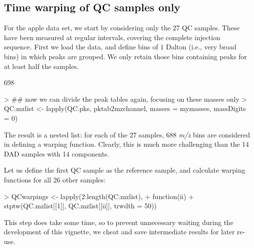 \documentclass[a4paper,11pt]{article}
\begin{document}
\subsection{Time warping of QC samples only}
For the apple data set, we start by considering only the 27 QC
samples. These have been measured at regular intervals,
covering the complete injection sequence. First we load the data, and
define bins of $1$ Dalton (i.e., very broad bins) in which peaks are
grouped. We only retain those bins containing peaks for at least half
the samples.
\begin{Schunk}
\begin{Soutput}
[1] 698
\end{Soutput}
\end{Schunk}
\begin{Schunk}
\begin{Sinput}
> ## now we can divide the peak tables again, focusing on these masses only 
> QC.mzlist <- lapply(QC.pks, pktab2mzchannel, masses = mymasses, massDigits = 0)
\end{Sinput}
\end{Schunk}
The result is a nested list: for each of the 27 samples, 688
\emph{m/z} bins are considered in defining a warping
function. Clearly, this is much more challenging than the 14 DAD
samples with 14 components.

Let us define the first QC sample as the reference sample, and
calculate warping functions for all 26 other samples:
\begin{Schunk}
\begin{Sinput}
> QCwarpings <- lapply(2:length(QC.mzlist),
+                      function(ii)
+                        stptw(QC.mzlist[[1]], QC.mzlist[[ii]], trwdth = 50))
\end{Sinput}
\end{Schunk}
This step does take some time, so to prevent unnecessary waiting
during the development of this vignette, we cheat and save
intermediate results for later re-use.
\end{document}
